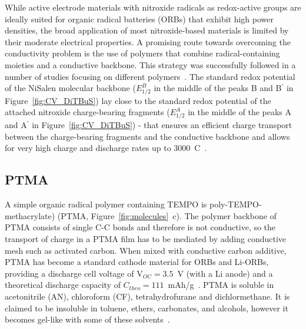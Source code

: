 \par
While active electrode materials with nitroxide radicals as redox-active groups are ideally suited for organic radical batteries (ORBs) that exhibit high power densities, the broad application of most nitroxide-based materials is limited by their moderate electrical properties. A promising route towards overcoming the conductivity problem is the use of polymers that combine radical-containing moieties and a conductive backbone. This strategy was successfully followed in a number of studies focusing on different polymers~\cite{oyaizu2015_polymerjournal, bahaceci2013_jpowersources, katsumata2006_mrc, xu2014_electact, aydin2015_jsoistatelect, schwartz2018_synthmet}. The standard redox potential of the NiSalen molecular backbone ($E_{1/2}^B$ in the middle of the peaks B and B$^\prime$ in Figure~\ref{fig:CV_DiTBuS}) lay close to the standard redox potential of the attached nitroxide charge-bearing fragments ($E_{1/2}^A$ in the middle of the peaks A and A$^\prime$ in Figure~\ref{fig:CV_DiTBuS}) - that ensures an efficient charge transport between the charge-bearing fragments and the conductive backbone and allows for very high charge and discharge rates up to 3000~C~\cite{Vereshchagin2020,Kulikov2022}.

\subsection{PTMA}
A simple organic radical polymer containing TEMPO is poly-TEMPO-methacrylate) (PTMA, Figure~\ref{fig:molecules}~c). The polymer backbone of PTMA consists of single C-C bonds and therefore is not conductive, so the transport of charge in a PTMA film has to be mediated by adding conductive mesh such as activated carbon. When mixed with conductive carbon additive, PTMA has become a standard cathode material for ORBs and Li-ORBs, providing a discharge cell voltage of V$_{OC}=3.5$~V (with a Li anode) and a theoretical discharge capacity of $C_{theo}=111$~mAh/g~\cite{Daniel2023_Multimodal}. PTMA is soluble in acetonitrile (AN), chloroform (CF), tetrahydrofurane and dichlormethane. It is claimed to be insoluble in toluene, ethers, carbonates, and alcohols, however it becomes gel-like with some of these solvents~\cite{DOM}.

